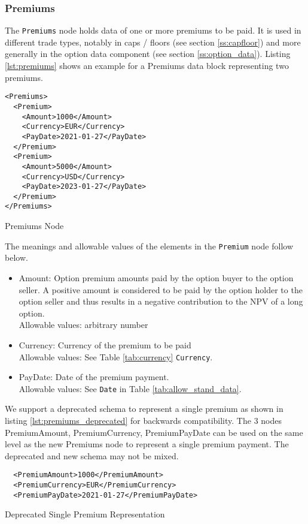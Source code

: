 \subsubsection{Premiums}
\label{ss:premiums}

The \lstinline!Premiums! node holds data of one or more premiums to be paid. It is used in different trade types,
notably in caps / floors (see section \ref{ss:capfloor}) and more generally in the option data component (see section
\ref{ss:option_data}). Listing \ref{lst:premiums} shows an example for a Premiums data block representing two premiums.

\begin{listing}[H]
\begin{verbatim}
<Premiums>
  <Premium>
    <Amount>1000</Amount>
    <Currency>EUR</Currency>
    <PayDate>2021-01-27</PayDate>
  </Premium>
  <Premium>
    <Amount>5000</Amount>
    <Currency>USD</Currency>
    <PayDate>2023-01-27</PayDate>
  </Premium>
</Premiums>
\end{verbatim}
\caption{Premiums Node}
\label{lst:premiums}
\end{listing}

The meanings and allowable values of the elements in the \lstinline!Premium! node follow below.

\begin{itemize}
\item Amount: Option premium amounts paid by the option buyer to the option seller. A positive amount is considered to be paid by the option holder to the option seller and thus results in a negative contribution to the NPV of a long option. \\
  Allowable values: arbitrary number
\item Currency: Currency of the premium to be paid\\
  Allowable values:  See Table \ref{tab:currency} \lstinline!Currency!.
\item PayDate: Date of the premium payment.\\
  Allowable values:  See \lstinline!Date! in Table \ref{tab:allow_stand_data}.
\end{itemize}

We support a deprecated schema to represent a single premium as shown in listing \ref{lst:premiums_deprecated} for
backwards compatibility. The $3$ nodes PremiumAmount, PremiumCurrency, PremiumPayDate can be used on the same level as
the new Premiums node to represent a single premium payment. The deprecated and new schema may not be mixed.

\begin{listing}[H]
\begin{verbatim}
  <PremiumAmount>1000</PremiumAmount>
  <PremiumCurrency>EUR</PremiumCurrency>
  <PremiumPayDate>2021-01-27</PremiumPayDate>
\end{verbatim}
\caption{Deprecated Single Premium Representation}
\label{lst:premiums_deprecated}
\end{listing}
